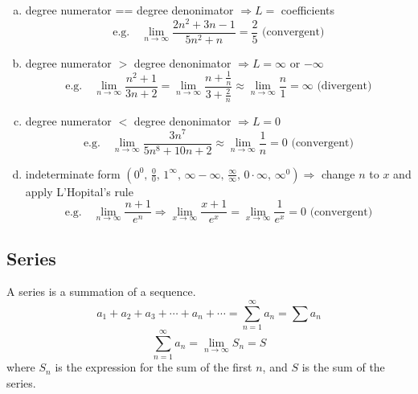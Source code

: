 \documentclass[8pt,letterpaper]{article}
\begin{document}
\begin{enumerate}[(a)]
\item degree numerator == degree denonimator $\Rightarrow L =$ coefficients
\begin{equation*}
\mbox{e.g.} \quad \lim_{n \to \infty} \frac{2n^2 + 3n - 1}{5n^2 + n} = \frac{2}{5}
\mbox{ (convergent)}
\end{equation*}

\item degree numerator $>$ degree denonimator $\Rightarrow L = \infty$ or $-\infty$
\begin{equation*}
\mbox{e.g.} \quad \lim_{n \to \infty} \frac{n^2 + 1}{3n + 2}
= \lim_{n \to \infty} \frac{n + \frac{1}{n}}{3 + \frac{2}{n}}
\approx \lim_{n \to \infty} \frac{n}{1} = \infty
\mbox{ (divergent)}
\end{equation*}

\item degree numerator $<$ degree denonimator $\Rightarrow L = 0$
\begin{equation*}
\mbox{e.g.} \quad \lim_{n \to \infty} \frac{3n^7}{5n^8 + 10n + 2}
\approx \lim_{n \to \infty} \frac{1}{n} = 0
\mbox{ (convergent)}
\end{equation*}

\item indeterminate form $\left(0^0,\, \frac{0}{0},\, 1^\infty,\, \infty - \infty,\, \frac{\infty}{\infty},\,0 \cdot \infty,\, \infty^0\right) \Rightarrow$ change $n$ to $x$ and apply L'Hopital's rule
\begin{equation*}
\mbox{e.g.} \quad \lim_{n \to \infty} \frac{n+1}{e^n} \Rightarrow \lim_{x \to \infty} \frac{x+1}{e^x}
= \lim_{x \to \infty} \frac{1}{e^x} = 0 
\mbox{ (convergent)}
\end{equation*}
\end{enumerate}

\subsection*{Series} %
A series is a summation of a sequence.
\begin{equation*}
a_1 + a_2 + a_3 + \cdots + a_n + \cdots = \sum_{n=1}^\infty a_n = \sum a_n
\end{equation*}
\begin{equation}
\sum_{n=1}^\infty a_n = \lim_{n \to \infty} S_n = S
\end{equation}
where $S_n$ is the expression for the sum of the first $n$, and $S$ is the sum of the series.
\end{document}
